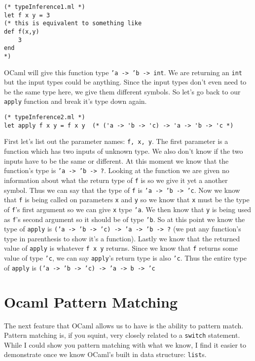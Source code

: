 \documentclass[main.tex]{subfiles}
\begin{document}
\begin{lstlisting}[style=Myocamlstyle]
(* typeInference1.ml *)
let f x y = 3
(* this is equivalent to something like 
def f(x,y)
    3
end
*)
\end{lstlisting}
OCaml will give this function type \texttt{'a -> 'b -> int}. We are returning an \texttt{int} but the input types could be anything. Since the input types don't even need to be the same type here, we give them different symbols. 
So let's go back to our \texttt{apply} function and break it's type down again.
\begin{lstlisting}[style=Myocamlstyle]
(* typeInference2.ml *)
let apply f x y = f x y  (* ('a -> 'b -> 'c) -> 'a -> 'b -> 'c *)
\end{lstlisting}
First let's list out the parameter names: \texttt{f, x, y}. The first parameter is a function which has two inputs of unknown type. We also don't know if the two inputs have to be the same or different. At this moment we know that the function's type
is \texttt{'a -> 'b -> ?}. Looking at the function we are given no information about what the return type of \texttt{f} is so
we give it yet a another symbol. Thus we can say that the type of \texttt{f} is \texttt{'a -> 'b -> 'c}. Now we know that \texttt{f} is being called on parameters \texttt{x} and \texttt{y} so we know that \texttt{x} must be the type of \texttt{f}'s first argument so we can give \texttt{x} type \texttt{'a}. We then know that \texttt{y} is being used as \texttt{f}'s second
argument so it should be of type \texttt{'b}. So at this point we know the type of \texttt{apply} is 
\texttt{('a -> 'b -> 'c) -> 'a -> 'b -> ?} (we put any function's type in parenthesis to show it's a function). Lastly we know that the returned value of \texttt{apply} is whatever \texttt{f x y} returns. Since we know that \texttt{f} returns some value of type \texttt{'c}, we can
say \texttt{apply}'s return type is also \texttt{'c}. Thus the entire type of \texttt{apply} is \texttt{('a -> 'b -> 'c) -> 'a -> b -> 'c}

\section{Ocaml Pattern Matching}

The next feature that OCaml allows us to have is the ability to pattern match. Pattern matching is, if you squint, very closely related to a \texttt{switch} statement. While I could show you pattern matching with what we know, I find it easier to demonstrate once we know OCaml's built in data structure: \texttt{list}s. 
\end{document}

